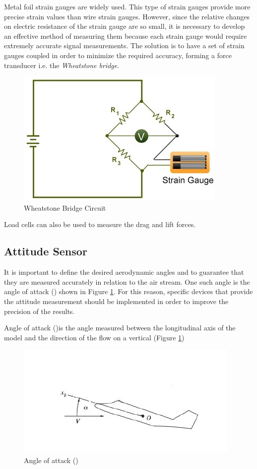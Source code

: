 Metal foil strain gauges are widely used. This type of strain gauges provide more precise strain values than wire strain gauges. However, since the relative changes on electric resistance of the strain gauge are so small, it is necessary to develop an effective method of measuring them because each strain gauge would require extremely accurate signal measurements. The solution is to have a set of strain gauges coupled in order to minimize the required accuracy, forming a force transducer i.e. the \textit{Wheatstone bridge}.
\begin{center}
		\begin{figure}[H]
		\centering
		\includegraphics[width=0.6\linewidth]{Figures/Fig9}
		\caption[Wheatstone Bridge Circuit]{Wheatstone Bridge Circuit \cite{ferreira2015design}}
		\end{figure}
\end{center}
Load cells can also be used to measure the drag and lift forces\cite{ferreira2015design}.
\subsection{Attitude Sensor}
It is important to define the desired aerodynamic angles and to guarantee that they are measured accurately in relation to the air stream. One such angle is the angle of attack (\textalpha) shown in Figure \ref{att}. For this reason, specific devices that provide the attitude measurement should be implemented in order to improve the precision of the results.

Angle of attack (\textalpha)is the angle measured between the longitudinal axis of the model and the direction of the flow on a vertical (Figure \ref{att})
\begin{center}
	\begin{figure}[H]
	\centering
	\includegraphics[width=0.6\linewidth]{Figures/Fig10}
	\caption[Angle of attack]{Angle of attack (\textalpha) \cite{ferreira2015design}}
	\label{att}
	\end{figure}
\end{center}
